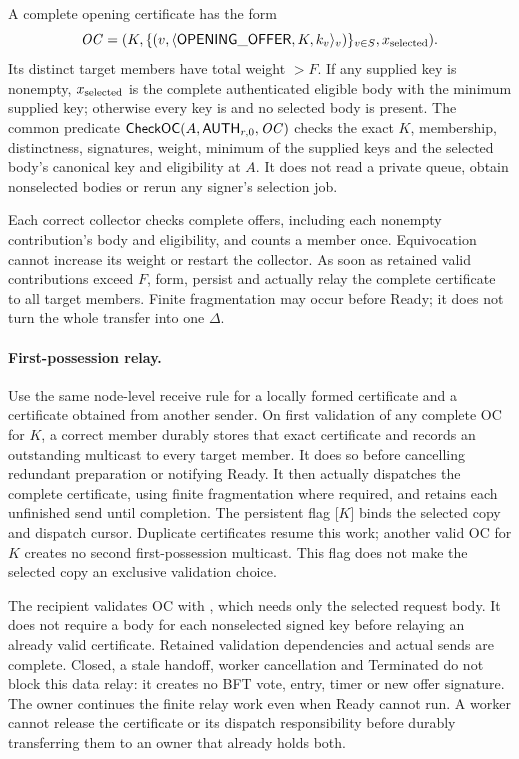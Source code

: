 \begin{definition}
\label{def:opening-certificate}
A complete opening certificate has the form
\[
 \mathit{OC}=(K,\{(v,\langle\mathsf{OPENING\_OFFER},K,k_v\rangle_v)\}_{v\in S},
                x_{\rm selected}).
\]
Its distinct target members have total weight $>F$. If any supplied key
is nonempty, $x_{\rm selected}$ is the complete authenticated eligible
body with the minimum supplied key; otherwise every key is 
and no selected body is present. The common predicate
$\mathsf{CheckOC}(A,\mathsf{AUTH}_{r,0},\mathit{OC})$ checks the exact $K$,
membership, distinctness, signatures, weight, minimum of the supplied
keys and the selected body's canonical key and eligibility at $A$.
It does not read a private queue, obtain nonselected bodies or rerun
any signer's selection job.
\end{definition}

Each correct collector checks complete offers, including each nonempty
contribution's body and eligibility, and counts a member once.
Equivocation cannot increase its weight or restart the collector.
As soon as retained valid contributions exceed $F$, form, persist and
actually relay the complete certificate to all target members. Finite
fragmentation may occur before Ready; it does not turn the whole
transfer into one $\Delta$.

\paragraph{First-possession relay.}
Use the same node-level receive rule for a locally formed certificate
and a certificate obtained from another sender. On first validation of
any complete OC for $K$, a correct member durably stores that exact
certificate and records an outstanding multicast to every target member.
It does so before cancelling redundant preparation or notifying Ready.
It then actually dispatches the complete certificate, using finite
fragmentation where required, and retains each unfinished send until
completion. The persistent flag [$K$] binds the selected
copy and dispatch cursor. Duplicate certificates resume this work;
another valid OC for $K$ creates no second first-possession multicast.
This flag does not make the selected copy an exclusive validation choice.

The recipient validates OC with , which needs only the
selected request body. It does not require a body for each nonselected
signed key before relaying an already valid certificate. Retained
validation dependencies and actual sends are complete. Closed, a stale
handoff, worker cancellation and Terminated do not block this data relay:
it creates no BFT vote, entry, timer or new offer signature. The owner
continues the finite relay work even when Ready cannot run. A worker
cannot release the certificate or its dispatch responsibility before
durably transferring them to an owner that already holds both.

